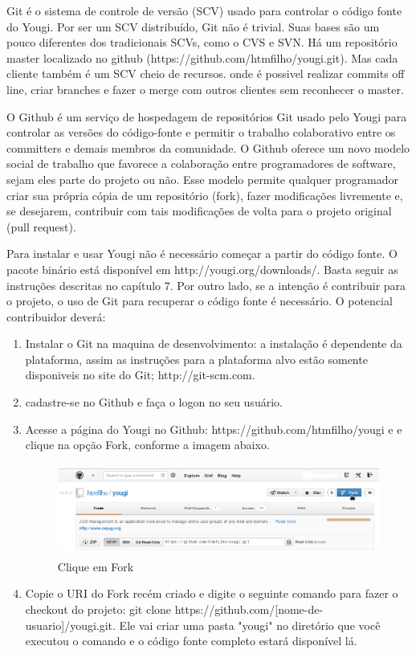 \documentclass[envcountsame,envcountchap,letterpaper]{svmono}
\begin{document}
Git é o sistema de controle de versão (SCV) usado para controlar o código fonte do Yougi. Por ser um SCV distribuído, Git não é trivial. Suas bases são um pouco diferentes dos tradicionais SCVs, como o CVS e SVN. Há um repositório master localizado no github (https://github.com/htmfilho/yougi.git). Mas cada cliente também é um SCV cheio de recursos. onde é possivel realizar commits off line, criar branches e fazer o merge com outros clientes sem reconhecer o master.

O Github é um serviço de hospedagem de repositórios Git usado pelo Yougi para controlar as versões do código-fonte e permitir o trabalho colaborativo entre os committers e demais membros da comunidade. O Github oferece um novo modelo social de trabalho que favorece a colaboração entre programadores de software, sejam eles parte do projeto ou não. Esse modelo permite qualquer programador criar sua própria cópia de um repositório (fork), fazer modificações livremente e, se desejarem, contribuir com tais modificações de volta para o projeto original (pull request).

Para instalar e usar Yougi não é necessário começar a partir do código fonte. O pacote binário está disponível em http://yougi.org/downloads/. Basta seguir as instruções descritas no capítulo 7. Por outro lado, se a intenção é contribuir para o projeto, o uso de Git para recuperar o código fonte é necessário. O potencial contribuidor deverá:

\begin{enumerate}
\item Instalar o Git na maquina de desenvolvimento: a instalação é dependente da plataforma, assim as instruções para a plataforma alvo estão somente disponiveis no site do Git; http://git-scm.com.
\item cadastre-se no Github e faça o logon no seu usuário.
\item Acesse a página do Yougi no Github: https://github.com/htmfilho/yougi e e clique na opção Fork, conforme a imagem abaixo.
\begin{figure}
\centering
\includegraphics[height=3cm, angle=0]{figures/fork-yougi-github}
\caption{Clique em Fork}
\label{fig:1}
\end{figure}
\item Copie o URI do Fork recém criado e digite o seguinte comando para fazer o checkout do projeto: git clone https://github.com/[nome-de-usuario]/yougi.git. Ele vai criar uma pasta "yougi" no diretório que você executou o comando e o código fonte completo estará disponível lá.
\end{enumerate}
\end{document}
